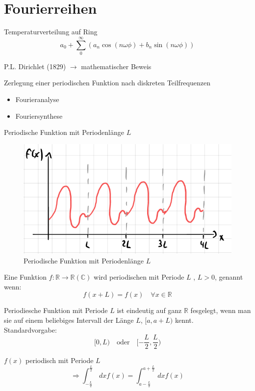 \section{Fourierreihen}

Temperaturverteilung auf Ring
$$a_0 + \sum_0^\infty (a_n \cos(n\omega\phi) + b_n \sin(n\omega\phi))$$

P.L. Dirichlet (1829) $\rightarrow$ mathematischer Beweis

Zerlegung einer periodischen Funktion nach diskreten Teilfrequenzen
\begin{itemize}
	\item Fourieranalyse
	\item Fouriersynthese
\end{itemize}

Periodische Funktion mit Periodenlänge $L$
\begin{figure}[H]
	\centering
	\includegraphics[width=0.7\linewidth]{Grafiken/2_Fourierreihen/Grafik1.PNG}
	\caption{Periodische Funktion mit Periodenlänge $L$}
	\label{}
\end{figure}

\begin{Def}
	Eine Funktion $f: \mathbb{R}\rightarrow\mathbb{R}(\mathbb{C})$ wird periodischen
	mit Periode $L$ , $L>0$, genannt wenn:
	$$f(x+L) = f(x) \quad \forall x \in \mathbb{R}$$
\end{Def}

\begin{Bem}
	Periodiesche Funktion mit Periode $L$ ist eindeutig auf ganz $\mathbb{R}$ fesgelegt,
	wenn man sie auf einem beliebiges Intervall der Länge $L$, $[a,a+L)$ kennt.\\
	Standardvorgabe:
	$$[0,L) \quad \textrm{oder} \quad [-\frac{L}{2}, \frac{L}{2})$$
\end{Bem}

\begin{Bem}
	$f(x)$ periodisch mit Periode $L$
	$$\Rightarrow \int_{-\frac{L}{2}}^{\frac{L}{2}} \,dx f(x) = \int_{a-\frac{L}{2}}^{a+\frac{L}{2}} \,dx f(x)$$
\end{Bem}

